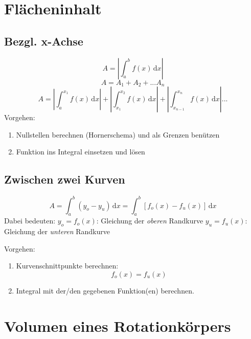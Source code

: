 
\section{Flächeninhalt} %
\label{sec:flächeninhalt}
\subsection{Bezgl. x-Achse} %
\label{sub:bezgl_x_achse}
\[ A = \left| \int_a^b f(x)\,\mathrm{d}x \right|\]
\[ A = A_1 + A_2 + ... A_n\]
\[ A = \left| \int_a^{x_1} f(x)\,\mathrm{d}x \right| + \left| \int_{x_1}^{x_2} f(x)\,\mathrm{d}x \right| + \left| \int_{x_{n-1}}^{x_n} f(x)\,\mathrm{d}x \right| ... \]
\newline Vorgehen:\newline
\begin{enumerate}
	\item Nullstellen berechnen (Hornerschema) und als Grenzen benützen
	\item Funktion ins Integral einsetzen und lösen
\end{enumerate}

\subsection{Zwischen zwei Kurven} %
\label{sub:zwischen_zwei_kurven}
\[ A = \int_a^b (y_o - y_u)\,\mathrm{d}x = \int_a^b [f_o(x) - f_u(x)]\,\mathrm{d}x\]
Dabei bedeuten:\newline
\( y_o = f_o(x)\): Gleichung der \emph{oberen} Randkurve\newline
\( y_u = f_u(x)\): Gleichung der \emph{unteren} Randkurve

Vorgehen:\newline
\begin{enumerate}
	\item Kurvenschnittpunkte berechnen:
	\[f_o(x) = f_u(x)\]
	\item Integral mit der/den gegebenen Funktion(en) berechnen.
\end{enumerate}


\section{Volumen eines Rotationkörpers} %
\label{sec:volumen_eines_rotationkörpers}
